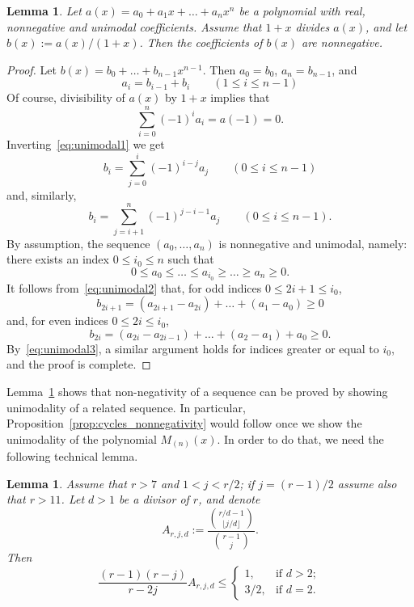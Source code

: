 \documentclass[10pt]{article}
\newtheorem{lemma}[theorem]{Lemma}
\theoremstyle{definition}
\begin{document}
\begin{lemma}\label{t:unimodal}
    Let $a(x) = a_0 + a_1 x + \ldots + a_n x^n$ be a polynomial with real, nonnegative and unimodal coefficients.
    Assume that $1+x$ divides $a(x)$, and let $b(x) := a(x)/(1+x)$.
    Then the coefficients of $b(x)$ are nonnegative.
\end{lemma}
	
\begin{proof}
    Let $b(x) = b_0 + \ldots + b_{n-1} x^{n-1}$.
    Then $a_0 = b_0$, $a_n = b_{n-1}$, and
    \begin{equation}\label{eq:unimodal1}
        a_i = b_{i-1} + b_i 
        \qquad (1 \le i \le n-1)
    \end{equation}
    Of course, divisibility of $a(x)$ by $1+x$ implies that
    \[
        \sum_{i=0}^{n} (-1)^i a_i = a(-1) = 0.
    \]
    Inverting~\eqref{eq:unimodal1} we get
    \begin{equation}\label{eq:unimodal2}
        b_i = \sum_{j=0}^i (-1)^{i-j} a_j
        \qquad (0 \le i \le n-1)
    \end{equation}
    and, similarly,
    \begin{equation}\label{eq:unimodal3}
        b_i = \sum_{j=i+1}^n (-1)^{j-i-1} a_j
        \qquad (0 \le i \le n-1).
    \end{equation}
    By assumption, the sequence $(a_0, \ldots, a_n)$ is nonnegative and unimodal, namely: 
    there exists an index $0 \le i_0 \le n$ such that
    \[
        0 \le a_0 \le \ldots \le a_{i_0} \ge \ldots \ge a_n \ge 0.
    \]
    It follows from~\eqref{eq:unimodal2} that, for odd indices $0 \le 2i+1 \le i_0$,
    \[
        b_{2i+1} = (a_{2i+1} - a_{2i}) + \ldots + (a_1 - a_0) \ge 0
    \]
    and, for even indices $0 \le 2i \le i_0$,
    \[
        b_{2i} = (a_{2i} - a_{2i-1}) + \ldots + (a_2 - a_1) + a_0 \ge 0.
    \]
    By~\eqref{eq:unimodal3}, a similar argument holds for 
    indices greater or equal to $i_0$, and the proof is complete.
\end{proof}
	
Lemma~\ref{t:unimodal} shows that non-negativity of a sequence can be proved by showing unimodality of a related sequence. In particular, Proposition~\ref{prop:cycles_nonnegativity} would follow once we show the unimodality of the polynomial $M_{(n)}(x)$.
In order to do that, we need the following technical lemma.

\begin{lemma}\label{lem:binomial_approx}
    Assume that $r > 7$ and $1 < j < r/2$;
    if $j = (r-1)/2$ assume also that $r > 11$.
    Let $d > 1$ be a divisor of $r$, and denote
	\[
	   A_{r,j,d} 
	   := \frac{\displaystyle\binom{r/d - 1} {\lfloor j/d \rfloor}} {\displaystyle\binom{r-1}{j}}.
	\]
	Then
	\[
	\frac{(r-1)(r-j)}{r-2j} A_{r,j,d} \le 
	\begin{cases}
	        1, &\text{if } d>2; \\
	        3/2, &\text{if } d=2.
	\end{cases}
	\]
\end{lemma}
	
\end{document}
